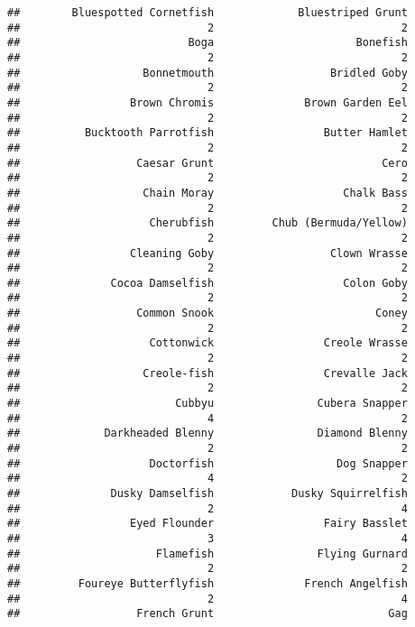 \documentclass[
]{article}
\begin{document}
\begin{verbatim}
##        Bluespotted Cornetfish             Bluestriped Grunt 
##                             2                             2 
##                          Boga                      Bonefish 
##                             2                             2 
##                   Bonnetmouth                  Bridled Goby 
##                             2                             2 
##                 Brown Chromis              Brown Garden Eel 
##                             2                             2 
##          Bucktooth Parrotfish                 Butter Hamlet 
##                             2                             2 
##                  Caesar Grunt                          Cero 
##                             2                             2 
##                   Chain Moray                    Chalk Bass 
##                             2                             2 
##                    Cherubfish         Chub (Bermuda/Yellow) 
##                             2                             2 
##                 Cleaning Goby                  Clown Wrasse 
##                             2                             2 
##              Cocoa Damselfish                    Colon Goby 
##                             2                             2 
##                  Common Snook                         Coney 
##                             2                             2 
##                    Cottonwick                 Creole Wrasse 
##                             2                             2 
##                   Creole-fish                 Crevalle Jack 
##                             2                             2 
##                        Cubbyu                Cubera Snapper 
##                             4                             2 
##             Darkheaded Blenny                Diamond Blenny 
##                             2                             2 
##                    Doctorfish                   Dog Snapper 
##                             4                             2 
##              Dusky Damselfish            Dusky Squirrelfish 
##                             2                             4 
##                 Eyed Flounder                 Fairy Basslet 
##                             3                             4 
##                     Flamefish                Flying Gurnard 
##                             2                             2 
##         Foureye Butterflyfish              French Angelfish 
##                             2                             4 
##                  French Grunt                           Gag 

\end{verbatim}
\end{document}

